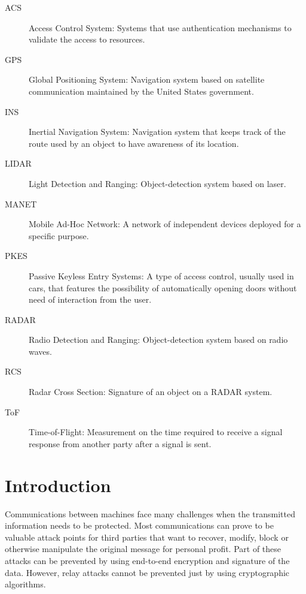 \documentclass{article}
\begin{document}
\begin{description}
  \item[ACS] Access Control System: Systems that use authentication mechanisms to validate the access to resources.
  \item[GPS] Global Positioning System: Navigation system based on satellite communication maintained by the United States government.
  \item[INS] Inertial Navigation System: Navigation system that keeps track of the route used by an object to have awareness of its location.
  \item[LIDAR] Light Detection and Ranging: Object-detection system based on laser.
  \item[MANET] Mobile Ad-Hoc Network: A network of independent devices deployed for a specific purpose.
  \item[PKES] Passive Keyless Entry Systems: A type of access control, usually used in cars, that features the possibility of automatically opening doors without need of interaction from the user.
  \item[RADAR] Radio Detection and Ranging: Object-detection system based on radio waves.
  \item[RCS] Radar Cross Section: Signature of an object on a RADAR system.
  \item[ToF] Time-of-Flight: Measurement on the time required to receive a signal response from another party after a signal is sent.
\end{description}

\newpage



\tableofcontents





\newpage








\section{Introduction}
\label{sec:introduction}

Communications between machines face many challenges when the transmitted information needs to be protected. Most communications can prove to be valuable attack points for third parties that want to recover, modify, block or otherwise manipulate the original message for personal profit. Part of these attacks can be prevented by using end-to-end encryption and signature of the data. However, relay attacks cannot be prevented just by using cryptographic algorithms.\\
\end{document}
